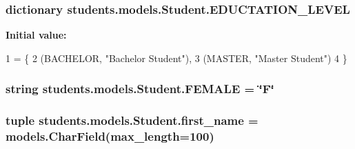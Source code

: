\hypertarget{classstudents_1_1models_1_1_student_a8f86f0fb0935aa98bf4e4c662c144943}{
\subsubsection[{E\-D\-U\-C\-T\-A\-T\-I\-O\-N\-\_\-\-L\-E\-V\-E\-L}]{\setlength{\rightskip}{0pt plus 5cm}dictionary students.\-models.\-Student.\-E\-D\-U\-C\-T\-A\-T\-I\-O\-N\-\_\-\-L\-E\-V\-E\-L\hspace{0.3cm}{\ttfamily [static]}}}\label{classstudents_1_1models_1_1_student_a8f86f0fb0935aa98bf4e4c662c144943}
{\bfseries Initial value\-:}
\begin{DoxyCode}
1 = \{
2         (BACHELOR, \textcolor{stringliteral}{"Bachelor Student"}),
3         (MASTER, \textcolor{stringliteral}{"Master Student"})
4     \}
\end{DoxyCode}
\hypertarget{classstudents_1_1models_1_1_student_a8de6077045683c830b41fcd0a41c4a8a}{
\subsubsection[{F\-E\-M\-A\-L\-E}]{\setlength{\rightskip}{0pt plus 5cm}string students.\-models.\-Student.\-F\-E\-M\-A\-L\-E = \char`\"{}F\char`\"{}\hspace{0.3cm}{\ttfamily [static]}}}\label{classstudents_1_1models_1_1_student_a8de6077045683c830b41fcd0a41c4a8a}
\hypertarget{classstudents_1_1models_1_1_student_a3fa9119af0d1c42d0beafad3d90b8153}{
\subsubsection[{first\-\_\-name}]{\setlength{\rightskip}{0pt plus 5cm}tuple students.\-models.\-Student.\-first\-\_\-name = models.\-Char\-Field(max\-\_\-length=100)\hspace{0.3cm}{\ttfamily [static]}}}\label{classstudents_1_1models_1_1_student_a3fa9119af0d1c42d0beafad3d90b8153}

